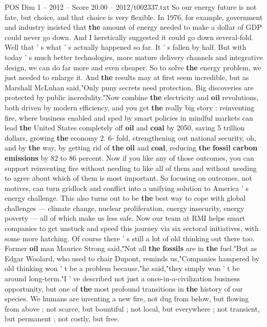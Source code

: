 \begin{textsample}{POS Dim 1 – 2012 – Score 20.00 – 2012/t002337.txt}
So our energy future is not fate, but choice, and that choice is very flexible.
In 1976, for example, government and industry insisted that \textbf{the} amount of energy needed to make a dollar of GDP could never go down.
And I heretically suggested it could go down several-fold.
Well that ' s what ' s actually happened so far.
It ' s fallen by half.
But with today ' s much better technologies, more mature delivery channels and integrative design, we can do far more and even cheaper.
So to solve \textbf{the} energy problem, we just needed to enlarge it.
And \textbf{the} results may at first seem incredible, but as Marshall McLuhan said,"Only puny secrets need protection.
Big discoveries are protected by public incredulity."Now combine \textbf{the} electricity and \textbf{oil} revolutions, both driven by modern efficiency, and you get \textbf{the} really big story : reinventing fire, where business enabled and sped by smart policies in mindful markets can lead \textbf{the} United States completely off \textbf{oil} and \textbf{coal} by 2050, saving 5 trillion dollars, growing \textbf{the} economy 2. 6- fold, strengthening out national security, oh, and by \textbf{the} way, by getting rid of \textbf{the} \textbf{oil} and \textbf{coal}, reducing \textbf{the} \textbf{fossil} \textbf{carbon} \textbf{emissions} by 82 to 86 percent.
Now if you like any of those outcomes, you can support reinventing fire without needing to like all of them and without needing to agree about which of them is most important.
So focusing on outcomes, not motives, can turn gridlock and conflict into a unifying solution to America ' s energy challenge.
This also turns out to be \textbf{the} best way to cope with global challenges — climate change, nuclear proliferation, energy insecurity, energy poverty — all of which make us less safe.
Now our team at RMI helps smart companies to get unstuck and speed this journey via six sectoral initiatives, with some more hatching.
Of course there ' s still a lot of old thinking out there too.
Former \textbf{oil} man Maurice Strong said,"Not all \textbf{the} \textbf{fossils} are in \textbf{the} fuel."But as Edgar Woolard, who used to chair Dupont, reminds us,"Companies hampered by old thinking won ' t be a problem because,"he said,"they simply won ' t be around long-term."I ' ve described not just a once-in-a-civilization business opportunity, but one of \textbf{the} most profound transitions in \textbf{the} history of our species.
We humans are inventing a new fire, not dug from below, but flowing from above ; not scarce, but bountiful ; not local, but everywhere ; not transient, but permanent ; not costly, but free.

\end{textsample}
